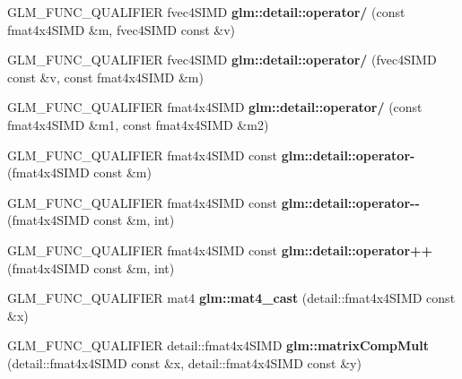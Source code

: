 \begin{DoxyCompactItemize}
\item 
\mbox{\label{simd__mat4_8inl_a9041c53e82c0b0191b24185e14e2b55f}} 
G\+L\+M\+\_\+\+F\+U\+N\+C\+\_\+\+Q\+U\+A\+L\+I\+F\+I\+ER fvec4\+S\+I\+MD {\bfseries glm\+::detail\+::operator/} (const fmat4x4\+S\+I\+MD \&m, fvec4\+S\+I\+MD const \&v)
\item 
\mbox{\label{simd__mat4_8inl_a147045f9002e1195039f968a2396c435}} 
G\+L\+M\+\_\+\+F\+U\+N\+C\+\_\+\+Q\+U\+A\+L\+I\+F\+I\+ER fvec4\+S\+I\+MD {\bfseries glm\+::detail\+::operator/} (fvec4\+S\+I\+MD const \&v, const fmat4x4\+S\+I\+MD \&m)
\item 
\mbox{\label{simd__mat4_8inl_ace681b03cfb7d72e2633dc06d4cee962}} 
G\+L\+M\+\_\+\+F\+U\+N\+C\+\_\+\+Q\+U\+A\+L\+I\+F\+I\+ER fmat4x4\+S\+I\+MD {\bfseries glm\+::detail\+::operator/} (const fmat4x4\+S\+I\+MD \&m1, const fmat4x4\+S\+I\+MD \&m2)
\item 
\mbox{\label{simd__mat4_8inl_a7f0cc16af5799679034230c9cea81b10}} 
G\+L\+M\+\_\+\+F\+U\+N\+C\+\_\+\+Q\+U\+A\+L\+I\+F\+I\+ER fmat4x4\+S\+I\+MD const {\bfseries glm\+::detail\+::operator-\/} (fmat4x4\+S\+I\+MD const \&m)
\item 
\mbox{\label{simd__mat4_8inl_a37b1c3ee6bcd2c5e56d49e2ea90f4ee5}} 
G\+L\+M\+\_\+\+F\+U\+N\+C\+\_\+\+Q\+U\+A\+L\+I\+F\+I\+ER fmat4x4\+S\+I\+MD const {\bfseries glm\+::detail\+::operator-\/-\/} (fmat4x4\+S\+I\+MD const \&m, int)
\item 
\mbox{\label{simd__mat4_8inl_afef703ea9bc24f3b3abbcc36e5ef65bb}} 
G\+L\+M\+\_\+\+F\+U\+N\+C\+\_\+\+Q\+U\+A\+L\+I\+F\+I\+ER fmat4x4\+S\+I\+MD const {\bfseries glm\+::detail\+::operator++} (fmat4x4\+S\+I\+MD const \&m, int)
\item 
\mbox{\label{simd__mat4_8inl_aaea24a8e252f68832f4d368be2035889}} 
G\+L\+M\+\_\+\+F\+U\+N\+C\+\_\+\+Q\+U\+A\+L\+I\+F\+I\+ER mat4 {\bfseries glm\+::mat4\+\_\+cast} (detail\+::fmat4x4\+S\+I\+MD const \&x)
\item 
\mbox{\label{simd__mat4_8inl_a3f8b69f9fddfae106e1a18ad66a17a1a}} 
G\+L\+M\+\_\+\+F\+U\+N\+C\+\_\+\+Q\+U\+A\+L\+I\+F\+I\+ER detail\+::fmat4x4\+S\+I\+MD {\bfseries glm\+::matrix\+Comp\+Mult} (detail\+::fmat4x4\+S\+I\+MD const \&x, detail\+::fmat4x4\+S\+I\+MD const \&y)

\end{DoxyCompactItemize}
